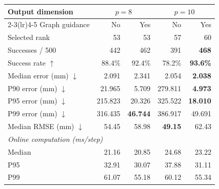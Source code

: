 \begin{figure}[tbp]
\centering
\begin{minipage}[t]{0.56\textwidth}
\vspace{0pt}
\centering
\small
\setlength{\tabcolsep}{2pt}
\begin{tabular*}{\linewidth}{@{}l@{\extracolsep{\fill}}rrrr@{}}
\toprule
Output dimension & \multicolumn{2}{c}{$p=8$} & \multicolumn{2}{c}{$p=10$} \\
\cmidrule(lr){2-3}\cmidrule(lr){4-5}
Graph guidance & No & Yes & No & Yes \\
\midrule
Selected rank & 53 & 53 & 57 & 60 \\
Successes / 500 & 442 & 462 & 391 & \textbf{468} \\
Success rate $\uparrow$ & 88.4\% & 92.4\% & 78.2\% & \textbf{93.6\%} \\
Median error (mm) $\downarrow$ & 2.091 & 2.341 & 2.054 & \textbf{2.038} \\
P90 error (mm) $\downarrow$ & 21.965 & 5.709 & 279.811 & \textbf{4.973} \\
P95 error (mm) $\downarrow$ & 215.823 & 20.326 & 325.522 & \textbf{18.010} \\
P99 error (mm) $\downarrow$ & 316.435 & \textbf{46.744} & 386.917 & 49.691 \\
Median RMSE (mm) $\downarrow$ & 54.45 & 58.98 & \textbf{49.15} & 62.43 \\
\midrule
\multicolumn{5}{l}{\textit{Online computation (ms/step)}} \\
Median & 21.16 & 20.85 & 24.68 & 23.22 \\
P95 & 32.91 & 30.07 & 37.88 & 31.11 \\
P99 & 61.07 & 55.18 & 60.12 & 55.34 \\
\bottomrule
\end{tabular*}
\label{tab:reacher-output-graph}
\end{minipage}\hfill
\begin{minipage}[t]{0.42\textwidth}

\end{minipage}
\end{figure}
